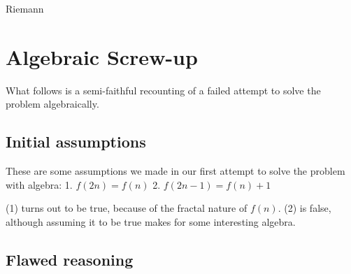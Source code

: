 \documentclass{article}
\begin{document}

Riemann

\section{Algebraic Screw-up}
What follows is a semi-faithful recounting of a failed attempt to solve the problem algebraically.
\subsection{Initial assumptions}
These are some assumptions we made in our first attempt to solve the problem with algebra:
1. $f(2n) = f(n)$
2. $f(2n-1) = f(n) + 1$

(1) turns out to be true, because of the fractal nature of $f(n)$.
(2) is false, although assuming it to be true makes for some interesting algebra.

\subsection{Flawed reasoning}
\end{document}
